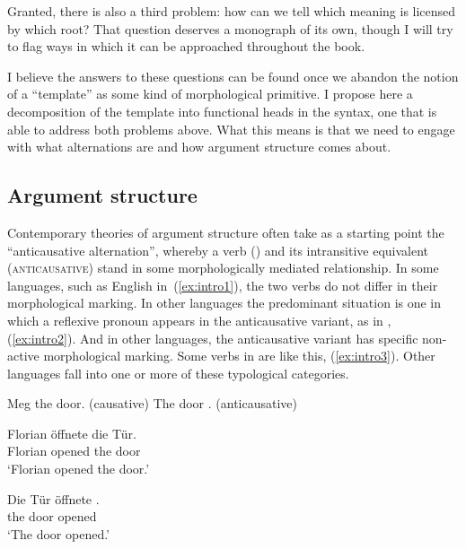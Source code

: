 \begin{exe}
\begin{xlist}
\begin{exe}
\begin{exe}
\begin{exe}
\begin{exe}
\begin{xlist}
Granted, there is also a third problem: how can we tell which meaning is licensed by which root? That question deserves a monograph of its own, though I will try to flag ways in which it can be approached throughout the book.

I believe the answers to these questions can be found once we abandon the notion of a ``template'' as some kind of morphological primitive. I propose here a decomposition of the template into functional heads in the syntax, one that is able to address both problems above. What this means is that we need to engage with what alternations are and how argument structure comes about.

	\subsection{Argument structure}
Contemporary theories of argument structure often take as a starting point the ``anticausative alternation'', whereby a  verb (\textsc{}) and its intransitive equivalent (\textsc{anticausative}) stand in some morphologically mediated relationship. In some languages, such as English in~(\ref{ex:intro1}), the two verbs do not differ in their morphological marking. In other languages the predominant situation is one in which a reflexive pronoun appears in the anticausative variant, as in , (\ref{ex:intro2}). And in other languages, the anticausative variant has specific non-active morphological marking. Some verbs in  are like this, (\ref{ex:intro3}). Other languages fall into one or more of these typological categories.

 \begin{exe}
 \ex \label{ex:intro1} 
 \begin{xlist} 
 	\ex  Meg the door. \hfill (causative) 
  	\ex  The door .			\hfill (anticausative) 
 \z

 \ex {} \label{ex:intro2} 
 \begin{xlist} 
 	\ex   
 		\gll Florian \"offnete die T\"ur.\\
		 Florian opened the door\\ 
 		\glt `Florian opened the door.' 
	
 	\ex   
 		\gll Die T\"ur \"offnete .\\
		 the door opened \\ 
 		\glt `The door opened.' 
	

\end{xlist}
\end{xlist}
\end{exe}
\end{xlist}
\end{exe}
\end{exe}
\end{exe}
\end{exe}
\end{xlist}
\end{exe}
